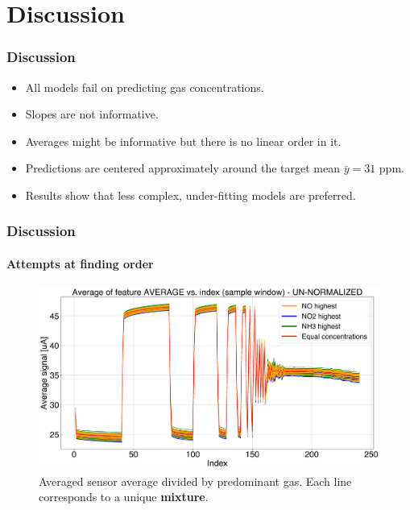 \documentclass{beamer}
\begin{document}
\section{Discussion}
\begin{frame}
	\frametitle{Discussion}
	
	\begin{itemize}
		\pause
		\item All models fail on predicting gas concentrations.
		\pause
		\item Slopes are not informative.
		\pause
		\item Averages might be informative but there is no linear order in it.
		\pause
		\item Predictions are centered approximately  around the target mean $\bar{y} = 31$ ppm.
		\pause
		\item Results show that less complex, under-fitting models are preferred.
		
	\end{itemize} 	
	
\end{frame}


\begin{frame}
	\frametitle{Discussion}
	\framesubtitle{Attempts at finding order}
		\begin{figure}
			\includegraphics[width=1\linewidth]{../../figures/order1.png}
			\caption{Averaged sensor average divided by predominant gas. Each line corresponds to a unique \textbf{mixture}.}
		\end{figure}
\end{frame}
\end{document}
